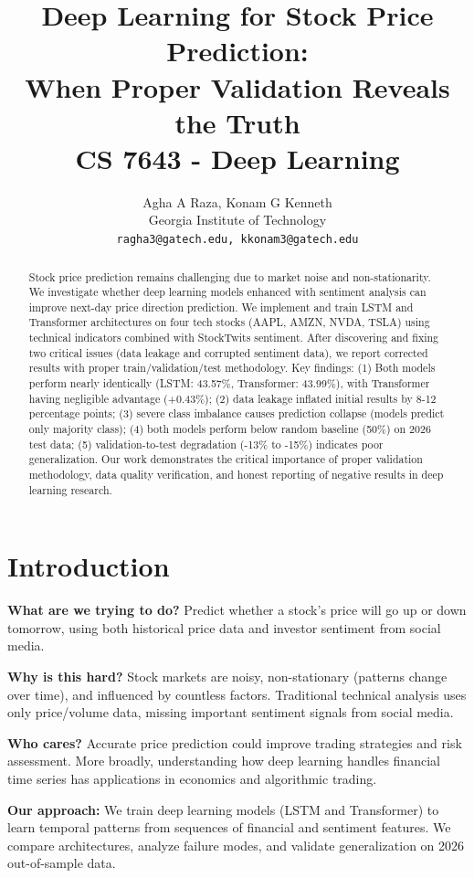 \documentclass[10pt,twocolumn]{article}
\title{\textbf{Deep Learning for Stock Price Prediction:\\When Proper Validation Reveals the Truth} \\[0.5em]
\large CS 7643 - Deep Learning}
\author{Agha A Raza, Konam G Kenneth \\
Georgia Institute of Technology \\
\texttt{ragha3@gatech.edu, kkonam3@gatech.edu}}
\date{}
\begin{document}
\maketitle

\begin{abstract}
\small
Stock price prediction remains challenging due to market noise and non-stationarity. We investigate whether deep learning models enhanced with sentiment analysis can improve next-day price direction prediction. We implement and train LSTM and Transformer architectures on four tech stocks (AAPL, AMZN, NVDA, TSLA) using technical indicators combined with StockTwits sentiment. After discovering and fixing two critical issues (data leakage and corrupted sentiment data), we report corrected results with proper train/validation/test methodology. Key findings: (1) Both models perform nearly identically (LSTM: 43.57\%, Transformer: 43.99\%), with Transformer having negligible advantage (+0.43\%); (2) data leakage inflated initial results by 8-12 percentage points; (3) severe class imbalance causes prediction collapse (models predict only majority class); (4) both models perform below random baseline (50\%) on 2026 test data; (5) validation-to-test degradation (-13\% to -15\%) indicates poor generalization. Our work demonstrates the critical importance of proper validation methodology, data quality verification, and honest reporting of negative results in deep learning research.
\end{abstract}

\section{Introduction}

\textbf{What are we trying to do?} Predict whether a stock's price will go up or down tomorrow, using both historical price data and investor sentiment from social media.

\textbf{Why is this hard?} Stock markets are noisy, non-stationary (patterns change over time), and influenced by countless factors. Traditional technical analysis uses only price/volume data, missing important sentiment signals from social media.

\textbf{Who cares?} Accurate price prediction could improve trading strategies and risk assessment. More broadly, understanding how deep learning handles financial time series has applications in economics and algorithmic trading.

\textbf{Our approach:} We train deep learning models (LSTM and Transformer) to learn temporal patterns from sequences of financial and sentiment features. We compare architectures, analyze failure modes, and validate generalization on 2026 out-of-sample data.
\end{document}
